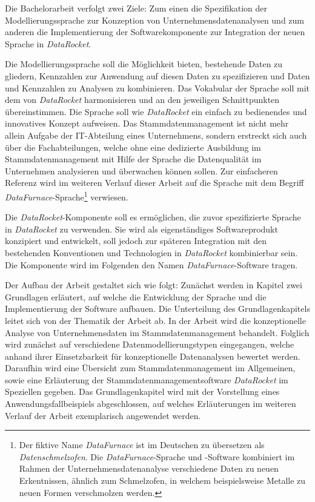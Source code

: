 \documentclass[
  language=german, %
  type=bachelor,%
  ngerman
]{isthesis}
\begin{document}
\begin{content}
  Die Bachelorarbeit verfolgt zwei Ziele: Zum einen die Spezifikation der
  Modellierungssprache zur Konzeption von Unternehmensdatenanalysen und zum
  anderen die Implementierung der Softwarekomponente zur Integration der neuen
  Sprache in \textit{DataRocket}.

  Die Modellierungssprache soll die Möglichkeit bieten, bestehende Daten zu
  gliedern, Kennzahlen zur Anwendung auf diesen Daten zu spezifizieren und
  Daten und Kennzahlen zu Analysen zu kombinieren. Das Vokabular der Sprache
  soll mit dem von \textit{DataRocket} harmonisieren und an den jeweiligen
  Schnittpunkten übereinstimmen.  Die Sprache soll wie \textit{DataRocket} ein
  einfach zu bedienendes und innovatives Konzept aufweisen. Das
  Stammdatenmanagement ist nicht mehr allein Aufgabe der IT-Abteilung eines
  Unternehmens, sondern erstreckt sich auch über die
  Fachabteilungen, welche ohne eine dedizierte Ausbildung im
  Stammdatenmanagement mit Hilfe der Sprache die Datenqualität im Unternehmen
  analysieren und überwachen können sollen. Zur einfacheren Referenz wird im
  weiteren Verlauf dieser Arbeit auf die Sprache mit dem Begriff
  \textit{DataFurnace}-Sprache\footnote{Der fiktive Name \textit{DataFurnace}
  ist im Deutschen zu übersetzen als \textit{Datenschmelzofen}. Die
  \textit{DataFurnace}-Sprache und -Software kombiniert im Rahmen der
  Unternehmensdatenanalyse verschiedene Daten zu neuen Erkentnissen, ähnlich
  zum Schmelzofen, in welchem beispielsweise Metalle zu neuen Formen
  verschmolzen werden.}  verwiesen.

  Die \textit{DataRocket}-Komponente soll es ermöglichen, die zuvor
  spezifizierte Sprache in \textit{DataRocket} zu verwenden. Sie wird als
  eigenständiges Softwareprodukt konzipiert und entwickelt, soll jedoch zur
  späteren Integration mit den bestehenden Konventionen und Technologien in
  \textit{DataRocket} kombinierbar sein. Die Komponente wird im Folgenden den
  Namen \textit{DataFurnace}-Software  tragen.

   Der Aufbau der Arbeit gestaltet sich wie folgt: Zunächst werden in Kapitel
   zwei Grundlagen erläutert, auf welche die Entwicklung der Sprache und die
   Implementierung der Software aufbauen. Die Unterteilung des
   Grundlagenkapitels leitet sich von der Thematik der Arbeit ab. In der Arbeit
   wird die konzeptionelle Analyse von Unternehmensdaten im
   Stammdatenmanagement behandelt. Folglich wird zunächst auf verschiedene
   Datenmodellierungstypen eingegangen, welche anhand ihrer Einsetzbarkeit für
   konzeptionelle Datenanalysen bewertet werden. Daraufhin wird eine Übersicht
   zum Stammdatenmanagement im Allgemeinen, sowie eine Erläuterung der
   Stammdatenmanagementsoftware \textit{DataRocket} im Speziellen gegeben. Das
   Grundlagenkapitel wird mit der Vorstellung eines Anwendungsfallbeispiels
   abgeschlossen, auf welches Erläuterungen im weiteren Verlauf der Arbeit
   exemplarisch angewendet werden.


\end{content}
\end{document}
